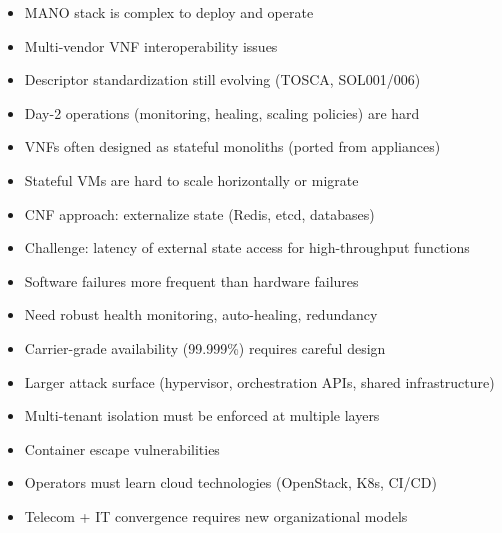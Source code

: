 \begin{itemize}
\tightlist
\item
  MANO stack is complex to deploy and operate
\item
  Multi-vendor VNF interoperability issues
\item
  Descriptor standardization still evolving (TOSCA, SOL001/\allowbreak{}006)
\item
  Day-2 operations (monitoring, healing, scaling policies) are hard
\end{itemize}


\begin{itemize}
\tightlist
\item
  VNFs often designed as stateful monoliths (ported from appliances)
\item
  Stateful VMs are hard to scale horizontally or migrate
\item
  CNF approach: externalize state (Redis, etcd, databases)
\item
  Challenge: latency of external state access for high-throughput functions
\end{itemize}


\begin{itemize}
\tightlist
\item
  Software failures more frequent than hardware failures
\item
  Need robust health monitoring, auto-healing, redundancy
\item
  Carrier-grade availability (99.999\%) requires careful design
\end{itemize}


\begin{itemize}
\tightlist
\item
  Larger attack surface (hypervisor, orchestration APIs, shared infrastructure)
\item
  Multi-tenant isolation must be enforced at multiple layers
\item
  Container escape vulnerabilities
\end{itemize}


\begin{itemize}
\tightlist
\item
  Operators must learn cloud technologies (OpenStack, K8s, CI/\allowbreak{}CD)
\item
  Telecom + IT convergence requires new organizational models
\end{itemize}

